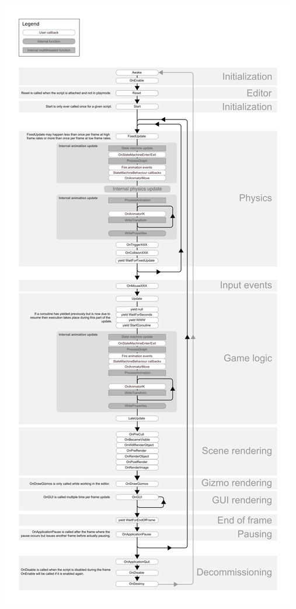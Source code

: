 \documentclass[12pt]{../rhitcsse}
\begin{document}
\begin{enumerate}
  \includegraphics[height=\textheight]{../figs/monobehaviour_flowchart.png}
  
\end{enumerate}
\end{document}
